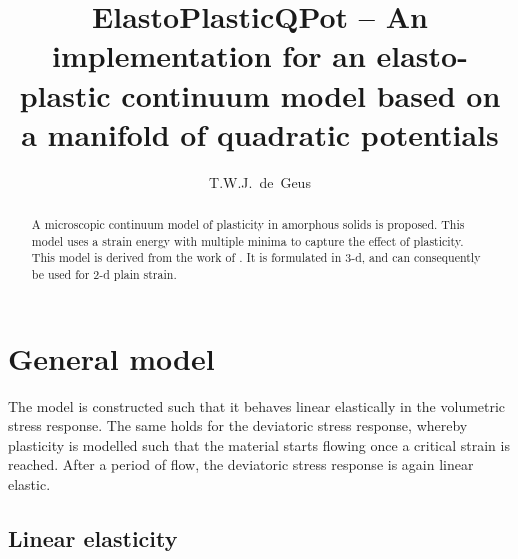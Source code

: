 \documentclass[times,namecite]{goose-article}
\title{%
  ElastoPlasticQPot -- An implementation for an elasto-plastic continuum model based on a manifold of quadratic potentials
}
\author{T.W.J.~de~Geus}
\begin{document}
\maketitle

\begin{abstract}
A microscopic continuum model of plasticity in amorphous solids is proposed. This model uses a strain energy with multiple minima to capture the effect of plasticity. This model is derived from the work of \citet{Jagla2017}. It is formulated in 3-d, and can consequently be used for 2-d plain strain.
\end{abstract}


\setcounter{tocdepth}{3}
\tableofcontents

\vfill\newpage
\section{General model}

The model is constructed such that it behaves linear elastically in the volumetric stress response. The same holds for the deviatoric stress response, whereby plasticity is modelled such that the material starts flowing once a critical strain is reached. After a period of flow, the deviatoric stress response is again linear elastic.

\subsection{Linear elasticity}
\end{document}
